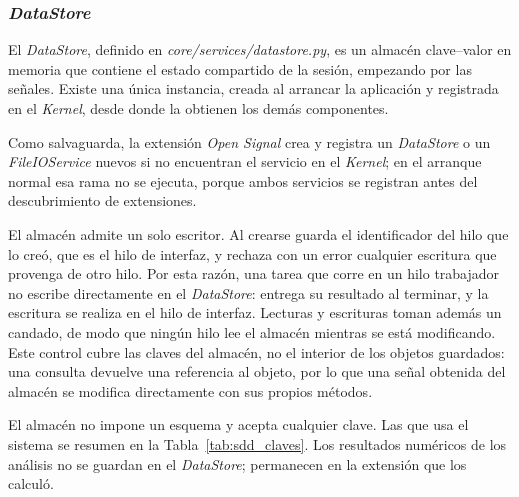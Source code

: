 \documentclass[12pt,letterpaper,oneside]{article}
\DeclareRobustCommand{\_}{\textunderscore\allowbreak}
\begin{document}
\subsubsection{\textit{DataStore}}
\label{sec:sdd_datastore}

El \textit{DataStore}, definido en \textit{core/services/data\_store.py}, es un almacén clave--valor en memoria que contiene el estado compartido de la sesión, empezando por las señales. Existe una única instancia, creada al arrancar la aplicación y registrada en el \textit{Kernel}, desde donde la obtienen los demás componentes.

Como salvaguarda, la extensión \textit{Open Signal} crea y registra un \textit{DataStore} o un \textit{FileIOService} nuevos si no encuentran el servicio en el \textit{Kernel}; en el arranque normal esa rama no se ejecuta, porque ambos servicios se registran antes del descubrimiento de extensiones.

El almacén admite un solo escritor. Al crearse guarda el identificador del hilo que lo creó, que es el hilo de interfaz, y rechaza con un error cualquier escritura que provenga de otro hilo. Por esta razón, una tarea que corre en un hilo trabajador no escribe directamente en el \textit{DataStore}: entrega su resultado al terminar, y la escritura se realiza en el hilo de interfaz. Lecturas y escrituras toman además un candado, de modo que ningún hilo lee el almacén mientras se está modificando. Este control cubre las claves del almacén, no el interior de los objetos guardados: una consulta devuelve una referencia al objeto, por lo que una señal obtenida del almacén se modifica directamente con sus propios métodos.

El almacén no impone un esquema y acepta cualquier clave. Las que usa el sistema se resumen en la Tabla~\ref{tab:sdd_claves}. Los resultados numéricos de los análisis no se guardan en el \textit{DataStore}; permanecen en la extensión que los calculó.
\end{document}
